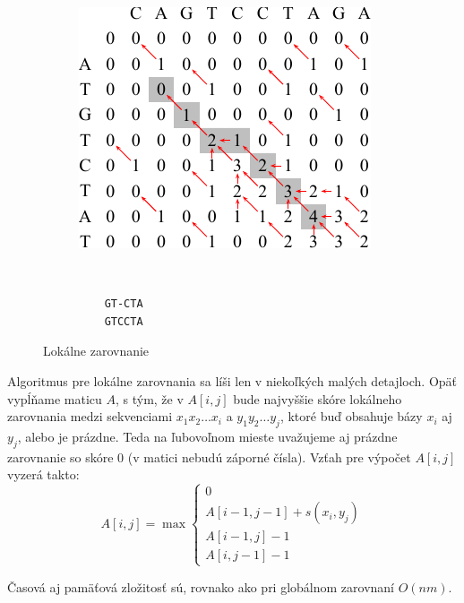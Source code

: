 \begin{figure}[htp]
    \centering
    \begin{subfigure}[m]{0.5\textwidth}
    \centering
    \includegraphics[width=\textwidth]{images/local_alignment}
    \end{subfigure}
    ~
    \begin{subfigure}[m]{0.3\textwidth}
    \centering
    \begin{verbatim}
    GT-CTA
    GTCCTA
    \end{verbatim}
    \end{subfigure}
    \caption{Lokálne zarovnanie}
    \label{fig:global-align}
\end{figure}

Algoritmus pre lokálne zarovnania sa líši len v niekoľkých malých detajloch. Opäť vypĺňame maticu $A$, s tým, že v $A[i,j]$ bude najvyššie skóre lokálneho zarovnania medzi sekvenciami $x_1x_2\dots x_i$ a $y_1y_2\dots y_j$, ktoré buď obsahuje bázy $x_i$ aj $y_j$, alebo je prázdne. Teda na ľubovoľnom mieste uvažujeme aj prázdne zarovnanie so skóre 0 (v matici nebudú záporné čísla). Vzťah pre výpočet $A[i,j]$ vyzerá takto:
$$A[i,j] = \max \left\{
\begin{array}{l}
0\\
A[i-1,j-1]+s(x_i, y_j)\\
A[i-1,j]-1\\
A[i,j-1]-1
\end{array} \right.$$

Časová aj pamäťová zložitosť sú, rovnako ako pri globálnom zarovnaní $O(nm)$.

